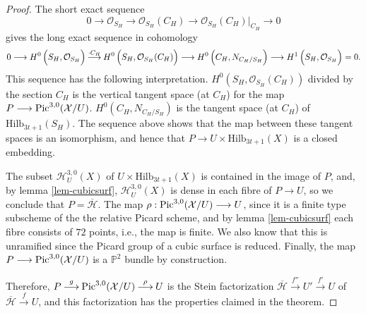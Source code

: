 \documentclass[twoside,12pt,reqno]{amsart}
\theoremstyle{plain}
\theoremstyle{definition}
\newcommand{\PP}{\mathbb{P}}
\newcommand{\Hi}[1]{\text{Hilb}_{#1}}
\def\pic{{\rm Pic}}
\def\ps{\vspace{4pt}}
\newcommand{\OO}{\mathcal O}
\renewcommand{\xrightarrow}[1]{\mathbin{\stackrel{#1}{\longrightarrow}}}
\begin{document}
\begin{proof}
\ps
The short exact sequence
$$0\longrightarrow \OO_{S_H} \longrightarrow \OO_{S_H}(C_H) 
\longrightarrow \OO_{S_H}(C_H)|_{C_H} \longrightarrow 0$$
gives the long exact sequence in cohomology
$$ 0  
     \longrightarrow 
   H^0\left({S_H,\OO_{S_H}\rule{0cm}{0.35cm}}\right)
     \xrightarrow{\cdot C_H}
   H^0\left({S_H,\OO_{S_H}(C_H)\rule{0cm}{0.35cm}}\right)
     \longrightarrow
   H^0\left({C_H,N_{C_H/S_H}\rule{0cm}{0.35cm}}\right)
     \longrightarrow
   H^1\left({S_H,\OO_{S_H}\rule{0cm}{0.35cm}}\right) = 0.
$$
This sequence has the following interpretation.  $H^0(S_H,\OO_{S_H}(C_H))$
divided by the section $C_H$ is the vertical tangent space (at $C_H$) for
the map $P\longrightarrow \pic^{3,0}(\mathcal{X}/U)$.  $H^0(C_H,N_{C_H/S_H})$
is the tangent space (at $C_H$) of $\Hi{3t+1}(S_H)$.  The sequence above
shows that the map between these tangent spaces is an isomorphism, and 
hence that $P\longrightarrow U\times \Hi{3t+1}(X)$ is a closed embedding.

\ps

The subset $\mathcal{H}_U^{3,0}(X)$ of $U\times\Hi{3t+1}(X)$ is contained 
in the image
of $P$, and, by lemma \ref{lem-cubicsurf}, $\mathcal{H}_U^{3,0}(X)$ is dense
in each fibre of $P\longrightarrow U$, so we conclude that $P=
\overline{\mathcal{H}}$.
The map $\rho:\pic^{3,0}(\mathcal{X}/U)\longrightarrow U$, since it is a 
finite type subscheme of the the relative Picard scheme, and by 
lemma \ref{lem-cubicsurf} each fibre
consists of $72$ points, i.e., the map is finite.  We also know that this
is unramified since the Picard group of a cubic surface is reduced.  Finally,
the map $P\longrightarrow \pic^{3,0}(\mathcal{X}/U)$ is a $\PP^2$ bundle
by construction.

\ps
Therefore, $P\xrightarrow{g}\pic^{3,0}(\mathcal{X}/U)\xrightarrow{\rho}
U$ is the Stein factorization
$\overline{\mathcal{H}}\xrightarrow{f''} U'\xrightarrow{f'} U$ of
$\overline{\mathcal{H}}\xrightarrow{f} U$, and this factorization has the 
properties claimed in the theorem.


\ps


\end{proof}
\end{document}
